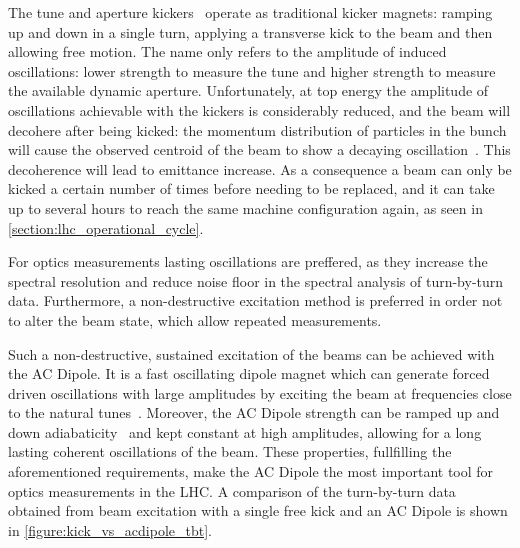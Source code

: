 The tune and aperture kickers~\cite{CERN:Barlow:Control_MKQA_LHC,IPMS:Carlier:Kicker_Pulse_Generator_Measurement_Tune_Dynamic_Aperture_LHC} operate as traditional kicker magnets: ramping up and down in a single turn, applying a transverse kick to the beam and then allowing free motion.
The name only refers to the amplitude of induced oscillations: lower strength to measure the tune and higher strength to measure the available dynamic aperture.
Unfortunately, at top energy the amplitude of oscillations achievable with the kickers is considerably reduced, and the beam will decohere after being kicked: the momentum distribution of particles in the bunch will cause the observed centroid of the beam to show a decaying oscillation~\cite{Report:Meller:Decoherence_Kicked_Beams}.
This decoherence will lead to emittance increase.
As a consequence a beam can only be kicked a certain number of times before needing to be replaced, and it can take up to several hours to reach the same machine configuration again, as seen in \cref{section:lhc_operational_cycle}.

For optics measurements lasting oscillations are preffered, as they increase the spectral resolution and reduce noise floor in the spectral analysis of turn-by-turn data.
Furthermore, a non-destructive excitation method is preferred in order not to alter the beam state, which allow repeated measurements.

Such a non-destructive, sustained excitation of the beams can be achieved with the AC Dipole.
It is a fast oscillating dipole magnet which can generate forced driven oscillations with large amplitudes by exciting the beam at frequencies close to the natural tunes~\cite{PHD:Miyamoto,CERN:Serrano:LHC_ACDipole_Introduction}.
Moreover, the AC Dipole strength can be ramped up and down adiabaticity~\cite{PRAB:Tomas:Adiabaticity_Ramping_Process_AC_Dipole} and kept constant at high amplitudes, allowing for a long lasting coherent oscillations of the beam.
These properties, fullfilling the aforementioned requirements, make the AC Dipole the most important tool for optics measurements in the LHC.
A comparison of the turn-by-turn data obtained from beam excitation with a single free kick and an AC Dipole is shown in \cref{figure:kick_vs_acdipole_tbt}.

